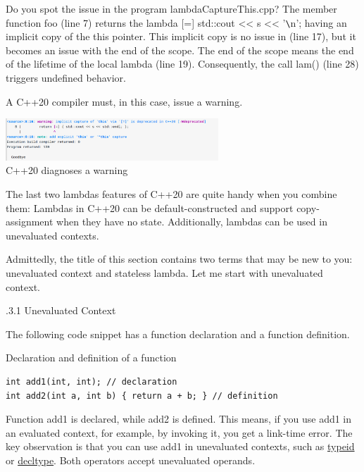 Do you spot the issue in the program lambdaCaptureThis.cpp? The member function foo (line 7) returns the lambda [=] { std::cout << s << '\verb|\|n'; } having an implicit copy of the this pointer. This implicit copy is no issue in (line 17), but it becomes an issue with the end of the scope. The end of the scope means the end of the lifetime of the local lambda (line 19). Consequently, the call lam() (line 28) triggers undefined behavior.

A C++20 compiler must, in this case, issue a warning.

\begin{center}
\includegraphics[width=0.6\textwidth]{content/3/chapter4/images/1-8.png}\\
C++20 diagnoses a warning
\end{center}

The last two lambdas features of C++20 are quite handy when you combine them: Lambdas in C++20 can be default-constructed and support copy-assignment when they have no state. Additionally, lambdas can be used in unevaluated contexts.


Admittedly, the title of this section contains two terms that may be new to you: unevaluated context and stateless lambda. Let me start with unevaluated context.

.3.1\hspace{0.2cm} Unevaluated Context

The following code snippet has a function declaration and a function definition.

\noindent
Declaration and definition of a function
\begin{lstlisting}[style=styleCXX]
int add1(int, int); // declaration
int add2(int a, int b) { return a + b; } // definition
\end{lstlisting}

Function add1 is declared, while add2 is defined. This means, if you use add1 in an evaluated context, for example, by invoking it, you get a link-time error. The key observation is that you can use add1 in unevaluated contexts, such as \href{https://en.cppreference.com/w/cpp/language/typeid}{typeid} or \href{https://en.cppreference.com/w/cpp/language/decltype}{decltype}. Both operators accept unevaluated operands.

